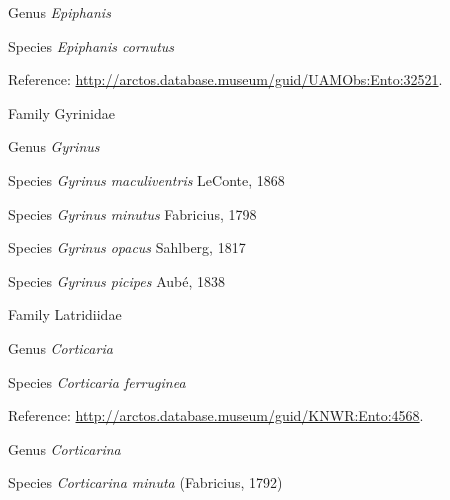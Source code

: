 \documentclass[9pt, article]{memoir}
\begin{document}
\begin{multicols}{2}
\vspace{6pt}\noindent\hspace{30pt}Genus \textit{Epiphanis}


\vspace{6pt}\noindent\hspace{36pt}Species \textit{Epiphanis cornutus}


Reference: 
\url{http://arctos.database.museum/guid/UAMObs:Ento:32521}.

\vspace{6pt}\noindent\hspace{24pt}Family Gyrinidae


\vspace{6pt}\noindent\hspace{30pt}Genus \textit{Gyrinus}


\vspace{6pt}\noindent\hspace{36pt}Species \textit{Gyrinus maculiventris} LeConte, 1868


\vspace{6pt}\noindent\hspace{36pt}Species \textit{Gyrinus minutus} Fabricius, 1798


\vspace{6pt}\noindent\hspace{36pt}Species \textit{Gyrinus opacus} Sahlberg, 1817


\vspace{6pt}\noindent\hspace{36pt}Species \textit{Gyrinus picipes} Aubé, 1838


\vspace{6pt}\noindent\hspace{24pt}Family Latridiidae


\vspace{6pt}\noindent\hspace{30pt}Genus \textit{Corticaria}


\vspace{6pt}\noindent\hspace{36pt}Species \textit{Corticaria ferruginea}


Reference: 
\url{http://arctos.database.museum/guid/KNWR:Ento:4568}.

\vspace{6pt}\noindent\hspace{30pt}Genus \textit{Corticarina}


\vspace{6pt}\noindent\hspace{36pt}Species \textit{Corticarina minuta} (Fabricius, 1792)



\end{multicols}
\end{document}
